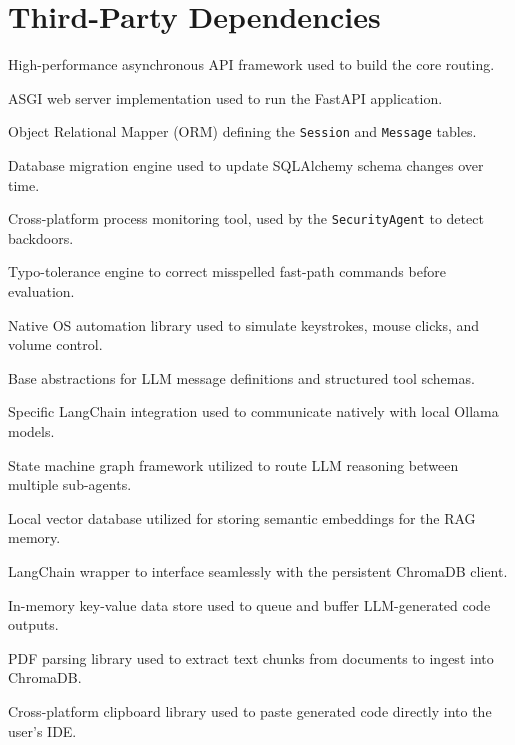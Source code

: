 \documentclass[11pt,a4paper]{report}
\begin{document}
\section{Third-Party Dependencies}
\begin{description}[leftmargin=!, labelwidth=4.5cm]
    \item[\texttt{fastapi}] High-performance asynchronous API framework used to build the core routing.
    \item[\texttt{uvicorn}] ASGI web server implementation used to run the FastAPI application.
    \item[\texttt{sqlalchemy}] Object Relational Mapper (ORM) defining the \texttt{Session} and \texttt{Message} tables.
    \item[\texttt{alembic}] Database migration engine used to update SQLAlchemy schema changes over time.
    \item[\texttt{psutil}] Cross-platform process monitoring tool, used by the \texttt{SecurityAgent} to detect backdoors.
    \item[\texttt{pyspellchecker}] Typo-tolerance engine to correct misspelled fast-path commands before evaluation.
    \item[\texttt{pyautogui}] Native OS automation library used to simulate keystrokes, mouse clicks, and volume control.
    \item[\texttt{langchain\_core}] Base abstractions for LLM message definitions and structured tool schemas.
    \item[\texttt{langchain\_ollama}] Specific LangChain integration used to communicate natively with local Ollama models.
    \item[\texttt{langgraph}] State machine graph framework utilized to route LLM reasoning between multiple sub-agents.
    \item[\texttt{chromadb}] Local vector database utilized for storing semantic embeddings for the RAG memory.
    \item[\texttt{langchain\_chroma}] LangChain wrapper to interface seamlessly with the persistent ChromaDB client.
    \item[\texttt{redis}] In-memory key-value data store used to queue and buffer LLM-generated code outputs.
    \item[\texttt{pypdf}] PDF parsing library used to extract text chunks from documents to ingest into ChromaDB.
    \item[\texttt{pyperclip}] Cross-platform clipboard library used to paste generated code directly into the user's IDE.
\end{description}
\end{document}
